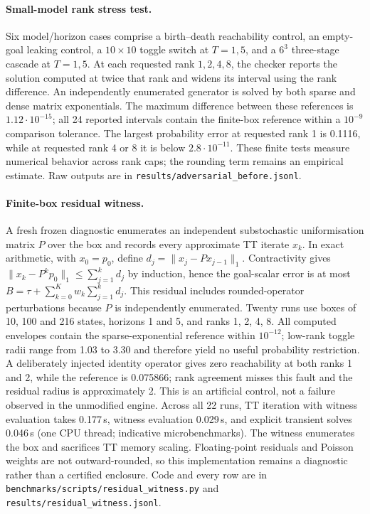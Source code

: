 \documentclass[11pt]{article}
\begin{document}
\begin{table}[t]
\centering\small
\resizebox{\textwidth}{!}{}
\caption{Cascade models with 32 copy numbers per species. $|\Delta|$: change between
the $\chi=32$ and $\chi=64$ runs. Times in seconds.}
\label{tab:scale}
\end{table}

\paragraph{Small-model rank stress test.} Six model/horizon cases comprise a
birth--death reachability control, an empty-goal leaking control, a $10\times10$
toggle switch at $T=1,5$, and a $6^3$ three-stage cascade at $T=1,5$. At each
requested rank $1,2,4,8$, the checker reports the solution computed at twice
that rank and widens its interval using the rank difference. An independently
enumerated generator is solved by both sparse and dense matrix exponentials.
The maximum difference between these references is $1.12\cdot10^{-15}$; all 24 reported intervals
contain the finite-box reference within a $10^{-9}$ comparison tolerance.
The largest probability error at requested rank 1 is 0.1116, while at
requested rank 4 or 8 it is below $2.8\cdot10^{-11}$. These finite tests
measure numerical behavior across rank caps; the rounding term remains an
empirical estimate. Raw outputs are in \texttt{results/adversarial\_before.jsonl}.

\paragraph{Finite-box residual witness.} A fresh frozen diagnostic enumerates
an independent substochastic uniformisation matrix $P$ over the box and
records every approximate TT iterate $x_k$. In exact arithmetic, with
$x_0=p_0$, define $d_j=\|x_j-Px_{j-1}\|_1$. Contractivity gives
$\|x_k-P^kp_0\|_1\le\sum_{j=1}^k d_j$ by induction, hence the goal-scalar
error is at most $B=\tau+\sum_{k=0}^K w_k\sum_{j=1}^k d_j$.
This residual includes rounded-operator perturbations because $P$ is
independently enumerated. Twenty runs use boxes of 10, 100 and 216 states,
horizons 1 and 5, and ranks 1, 2, 4, 8. All computed envelopes contain the
sparse-exponential reference within $10^{-12}$; low-rank toggle radii range
from 1.03 to 3.30 and therefore yield no useful probability restriction.
A deliberately injected identity operator gives zero reachability at both
ranks 1 and 2, while the reference is 0.075866; rank agreement misses this
fault and the residual radius is approximately 2. This is an artificial
control, not a failure observed in the unmodified engine. Across all 22 runs,
TT iteration with witness evaluation takes 0.177\,s, witness evaluation
0.029\,s, and explicit transient solves 0.046\,s (one CPU thread; indicative
microbenchmarks). The witness enumerates the box and sacrifices TT memory
scaling. Floating-point residuals and Poisson weights are not outward-rounded,
so this implementation remains a diagnostic rather than a certified enclosure.
Code and every row are in \texttt{benchmarks/scripts/residual\_witness.py} and
\texttt{results/residual\_witness.jsonl}.
\end{document}
